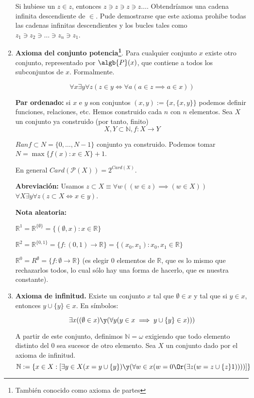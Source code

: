 \begin{enumerate}
		 \begin{obs}
		 	Si hubiese un $z\in z$, entonces $z\ni z\ni z\ni z\hdots$. Obtendríamos una cadena infinita descendiente de $\in$.
		 	Pude demostrarse que este axioma prohibe todas las cadenas infinitas descendientes y los bucles tales como $z_1\ni z_2\ni \hdots \ni z_n \ni z_1$.
		 \end{obs}
		 
		 \item \textbf{Axioma del conjunto potencia\footnote{También conocido como axioma de partes}}. Para cualquier conjunto $x$ existe otro conjunto, representado por $\algb{P}(x)$, que contiene a todos los subconjuntos de $x$. Formalmente.

		 \[\forall x \exists y \forall z (z \in y \iff \forall a (a\in z \implies a \in x))\]
		 
		 \textbf{Par ordenado:} si $x$ e $y$ son conjuntos $(x,y):=\{x, \{x,y\} \}$ podemos definir funciones, relaciones, etc. Hemos construido cada $n$ con $n$ elementos. Sea $X$ un conjunto ya construido (por tanto, finito)
		 $$X,Y \subset \mathbb{N}, f:X\to Y$$
		 
		 $Ran f \subset N = \{0, \hdots, N-1\}$ conjunto ya construido. Podemos tomar $N = \max \{f(x): x \in X\} + 1$.
		 
		 En general $Card(\mathcal{P}(X)) = 2^{Card(X)}$.
		 
		 \textbf{Abreviación: } Usamos $z\subset X \equiv \forall w((w\in z)\implies (w\in X))$
		 $\forall X \exists y \forall z(z\subset X\iff x\in y)$.
		 
		 \textbf{Nota aleatoria:}
		 
		 $\mathbb{R}^1 = \mathbb{R}^{\{\emptyset\}} = \{(\emptyset, x): x\in\mathbb{R}\}$
		 
		 $\mathbb{R}^2 = \mathbb{R}^{\{0,1\}} = \{f:(0,1)\to \mathbb{R}\} = \{(x_0, x_1): x_0, x_1 \in \mathbb{R}\}$
		 
		 $\mathbb{R}^0 = R^\emptyset = \{f:\emptyset\to \mathbb{R}\}$ (es elegir 0 elementos de $\mathbb{R}$, que es lo mismo que rechazarlos todos, lo cual sólo hay una forma de hacerlo, que es nuestra constante).
		 
		 \item \textbf{Axioma de infinitud.} Existe un conjunto $x$ tal que $\emptyset \in x$ y tal que si $y\in x$, entonces $y \cup \{y\}\in x$. En símbolos:

		 $$\exists x ((\emptyset\in x)\y (\forall y(y\in x \implies y\cup \{y\} \in x)))$$
		 
		 A partir de este conjunto, definimos $\mathbb{N} = \omega$ exigiendo que todo elemento distinto del 0 sea sucesor de otro elemento. Sea $X$ un conjunto dado por el axioma de infinitud.
		 $$\mathbb{N}:= \{x\in X:\left[\exists y \in X (x=y\cup \{y\})\y (\forall w\in x (w=0\Or (\exists z(w=z\cup \{z\}1)))) \right]\}$$
		 

\end{enumerate}
